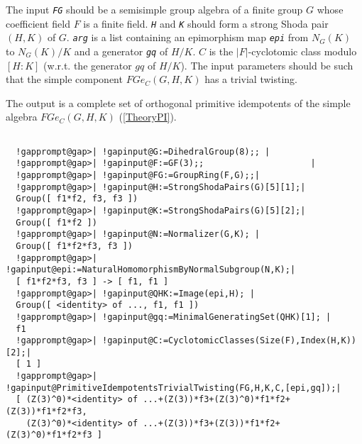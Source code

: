\documentclass[a4paper,11pt]{report}
\begin{document}
{{{ The input \mbox{\texttt{\mdseries\slshape FG}} should be a semisimple group algebra of a finite group $G$ whose coefficient field $F$ is a finite field. \mbox{\texttt{\mdseries\slshape H}} and \mbox{\texttt{\mdseries\slshape K}} should form a strong Shoda pair $(H,K)$ of $G$. \mbox{\texttt{\mdseries\slshape arg}} is a list containing an epimorphism map \mbox{\texttt{\mdseries\slshape epi}} from $N_G(K)$ to $N_G(K)/K$ and a generator \mbox{\texttt{\mdseries\slshape gq}} of $H/K$. $C$ is the $|F|$-cyclotomic class modulo $[H:K]$ (w.r.t. the generator $gq$ of $H/K$). The input parameters should be such that the simple component $FGe_C(G,H,K)$ has a trivial twisting. 

 The output is a complete set of orthogonal primitive idempotents of the simple
algebra $FGe_C(G,H,K)$ (\ref{TheoryPI}). 
\begin{Verbatim}[commandchars=!@|,fontsize=\small,frame=single,label=Example]
  
  !gapprompt@gap>| !gapinput@G:=DihedralGroup(8);; |
  !gapprompt@gap>| !gapinput@F:=GF(3);;                     |
  !gapprompt@gap>| !gapinput@FG:=GroupRing(F,G);;|
  !gapprompt@gap>| !gapinput@H:=StrongShodaPairs(G)[5][1];|
  Group([ f1*f2, f3, f3 ])
  !gapprompt@gap>| !gapinput@K:=StrongShodaPairs(G)[5][2];|
  Group([ f1*f2 ])
  !gapprompt@gap>| !gapinput@N:=Normalizer(G,K); |
  Group([ f1*f2*f3, f3 ])
  !gapprompt@gap>| !gapinput@epi:=NaturalHomomorphismByNormalSubgroup(N,K);|
  [ f1*f2*f3, f3 ] -> [ f1, f1 ]
  !gapprompt@gap>| !gapinput@QHK:=Image(epi,H); |
  Group([ <identity> of ..., f1, f1 ])
  !gapprompt@gap>| !gapinput@gq:=MinimalGeneratingSet(QHK)[1]; |
  f1
  !gapprompt@gap>| !gapinput@C:=CyclotomicClasses(Size(F),Index(H,K))[2];|
  [ 1 ]
  !gapprompt@gap>| !gapinput@PrimitiveIdempotentsTrivialTwisting(FG,H,K,C,[epi,gq]);|
  [ (Z(3)^0)*<identity> of ...+(Z(3))*f3+(Z(3)^0)*f1*f2+(Z(3))*f1*f2*f3, 
    (Z(3)^0)*<identity> of ...+(Z(3))*f3+(Z(3))*f1*f2+(Z(3)^0)*f1*f2*f3 ]
  
\end{Verbatim}
 }

 }

 }

    
\end{document}
